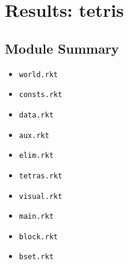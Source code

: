 \documentclass{article}
\newcommand{\mono}[1]{\texttt{#1}}
\begin{document}
\section{Results: tetris}

\subsection{Module Summary}
\begin{itemize}
\item \mono{world.rkt}
\item \mono{consts.rkt}
\item \mono{data.rkt}
\item \mono{aux.rkt}
\item \mono{elim.rkt}
\item \mono{tetras.rkt}
\item \mono{visual.rkt}
\item \mono{main.rkt}
\item \mono{block.rkt}
\item \mono{bset.rkt}\end{itemize}
\end{document}
